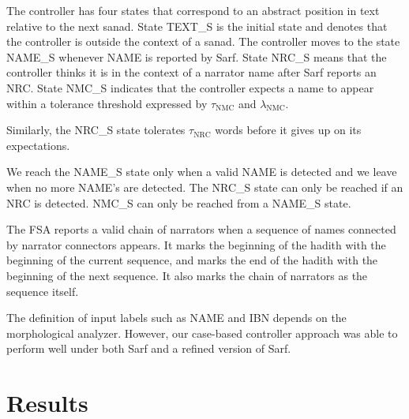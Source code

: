 \documentclass[11pt,letterpaper]{article}
\begin{document}
The controller has four states that correspond to 
an abstract position in text relative to the next sanad. 
State TEXT\_S is the initial state and denotes that
the controller is outside the context of a sanad.
The controller moves to the state NAME\_S whenever
NAME is reported by Sarf.
State NRC\_S means that the controller thinks it is in the context
of a narrator name after Sarf reports an NRC.
State NMC\_S
indicates that the controller expects a name to appear within 
a tolerance threshold expressed by 
$\tau_{\mbox{NMC}}$ and $\lambda_{\mbox{NMC}}$.

\begin{figure}[tb!]
\end{figure}

Similarly, the NRC\_S state tolerates $\tau_{\mbox{NRC}}$ words 
before it gives up on its expectations. 

We reach the NAME\_S state only when a
valid NAME is detected and we leave when no more NAME's are detected. 
The NRC\_S state can only be reached if an NRC is detected.
NMC\_S can only be reached from a NAME\_S state.

The FSA reports a valid chain of narrators when a sequence of names
connected by narrator connectors appears. 
It marks the beginning of the hadith with the beginning of the current sequence,
and marks the end of the hadith with the beginning of the next sequence. 
It also marks the chain of narrators as the sequence itself. 

The definition of input labels such as NAME and IBN depends on the 
morphological analyzer. 
However, our case-based controller approach was able to perform well
under both Sarf and a refined version of Sarf.


\section{Results}
\label{sec:results}
\end{document}
